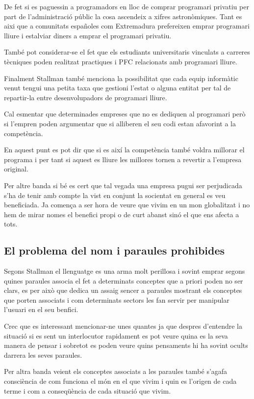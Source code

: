 \documentclass[a4paper,11pt]{scrartcl}
\begin{document}
De fet si es paguessin a programadors en lloc de comprar programari
privatiu per part de l'administració públic la cosa ascendeix
a xifres astronòmiques. Tant es aixi que a comunitats españoles
com Extremadura prefereixen emprar programari lliure i estalviar
diners a emprar el programari privatiu.

També pot considerar-se el fet que els estudiants universitaris
vinculats a carreres tècniques poden realitzat practiques i PFC
relacionats amb programari lliure.

Finalment Stallman també menciona la possibilitat que cada
equip informàtic venut tengui una petita taxa que gestioni
l'estat o alguna entitat per tal de repartir-la entre
desenvolupadors de programari lliure.

Cal esmentar que determinades empreses que no es dediquen
al programari però si l'empren poden argumentar que si
alliberen el seu codi estan afavorint a la competència.

En aquest punt es pot dir que si es així la competència
també voldra millorar el programa i per tant si aquest
es lliure les millores tornen a revertir a l'empresa original.

Per altre banda si bé es cert que tal vegada una empresa pugui
ser perjudicada s'ha de tenir amb compte la vist en conjunt
la socientat en general es veu beneficiada. Ja comença a ser
hora de veure que vivim en un mon globalitzat i no hem 
de mirar nomes el benefici propi o de curt abanst sinó
el que ens afecta a tots.

\subsection{El problema del nom i paraules prohibides}
Segons Stallman el llenguatge es una arma molt perillosa
i sovint emprar segons quines paraules associa el fet a
determinats conceptes que a priori poden no ser clars,
es per això que dedica un assaig sencer a paraules
mostrant els conceptes que porten associats i com
determinats sectors les fan servir per manipular 
l'usuari en el seu benfici.

Crec que es interessant mencionar-ne unes quantes
ja que despres d'entendre la situació si es sent
un interlocutor rapidament es pot veure quina
es la seva manera de pensar i sobretot es poden
veure quins pensaments hi ha sovint ocults darrera
les seves paraules.

Per altra banda veient els conceptes associats a les paraules
també s'agafa consciència de com funciona el món en el que
vivim i quin es l'origen de cada terme i com a conseqüència
de cada situació que vivim.
\end{document}
